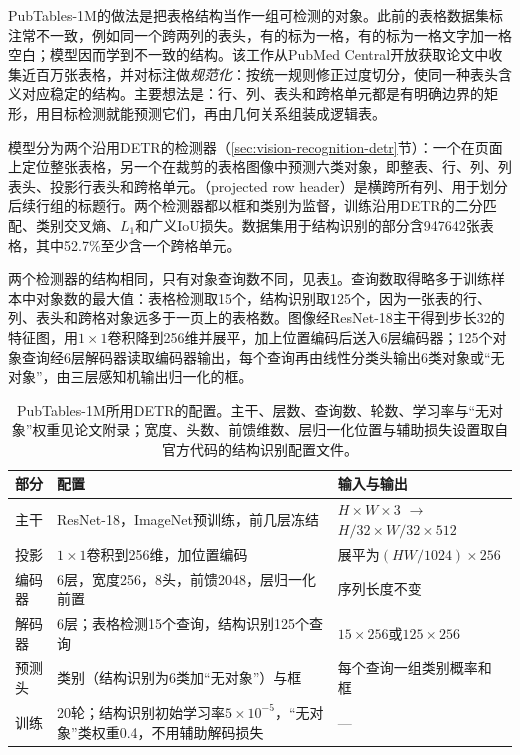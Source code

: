PubTables-1M的做法是把表格结构当作一组可检测的对象。此前的表格数据集标注常不一致，例如同一个跨两列的表头，有的标为一格，有的标为一格文字加一格空白；模型因而学到不一致的结构。该工作从PubMed Central开放获取论文中收集近百万张表格，并对标注做\emph{规范化}：按统一规则修正过度切分，使同一种表头含义对应稳定的结构。主要想法是：行、列、表头和跨格单元都是有明确边界的矩形，用目标检测就能预测它们，再由几何关系组装成逻辑表。

模型分为两个沿用DETR的检测器（\ref{sec:vision-recognition-detr}节）：一个在页面上定位整张表格，另一个在裁剪的表格图像中预测六类对象，即整表、行、列、列表头、投影行表头和跨格单元。（projected row header）是横跨所有列、用于划分后续行组的标题行。两个检测器都以框和类别为监督，训练沿用DETR的二分匹配、类别交叉熵、$L_1$和广义IoU损失。数据集用于结构识别的部分含947642张表格，其中52.7\%至少含一个跨格单元。

两个检测器的结构相同，只有对象查询数不同，见表\ref{tab:vision-understanding-pubtables-config}。查询数取得略多于训练样本中对象数的最大值：表格检测取15个，结构识别取125个，因为一张表的行、列、表头和跨格对象远多于一页上的表格数。图像经ResNet-18主干得到步长32的特征图，用$1\times1$卷积降到256维并展平，加上位置编码后送入6层编码器；125个对象查询经6层解码器读取编码器输出，每个查询再由线性分类头输出6类对象或“无对象”，由三层感知机输出归一化的框。

\begin{table}[htbp]
  \centering
  \small
  \begin{tabularx}{\linewidth}{@{}p{14mm}XX@{}}
    \toprule
    部分 & 配置 & 输入与输出\\
    \midrule
    主干 & ResNet-18，ImageNet预训练，前几层冻结 & $H\times W\times3$ \ensuremath{\to} $H/32\times W/32\times512$\\
    投影 & $1\times1$卷积到256维，加位置编码 & 展平为$(HW/1024)\times256$\\
    编码器 & 6层，宽度256，8头，前馈2048，层归一化前置 & 序列长度不变\\
    解码器 & 6层；表格检测15个查询，结构识别125个查询 & $15\times256$或$125\times256$\\
    预测头 & 类别（结构识别为6类加“无对象”）与框 & 每个查询一组类别概率和框\\
    训练 & 20轮；结构识别初始学习率$5\times10^{-5}$，“无对象”类权重0.4，不用辅助解码损失 & —\\
    \bottomrule
  \end{tabularx}
  \caption{PubTables-1M所用DETR的配置。主干、层数、查询数、轮数、学习率与“无对象”权重见论文附录；宽度、头数、前馈维数、层归一化位置与辅助损失设置取自官方代码的结构识别配置文件。}
  \label{tab:vision-understanding-pubtables-config}
\end{table}

